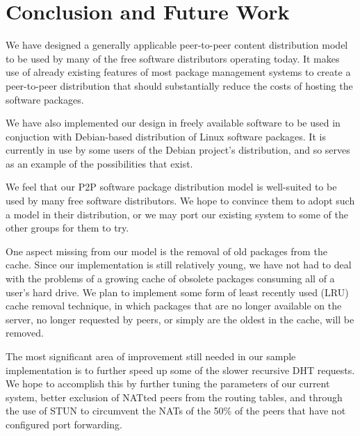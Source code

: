 \documentclass[conference]{IEEEtran}
\begin{document}

\section{Conclusion and Future Work}
\label{conclusions}

We have designed a generally applicable peer-to-peer content
distribution model to be used by many of the free software
distributors operating today. It makes use of already existing
features of most package management systems to create a
peer-to-peer distribution that should substantially reduce the costs
of hosting the software packages.

We have also implemented our design in freely available software to
be used in conjuction with Debian-based distribution of Linux
software packages. It is currently in use by some users of the
Debian project's distribution, and so serves as an example of the
possibilities that exist.

We feel that our P2P software package distribution model is
well-suited to be used by many free software distributors. We hope
to convince them to adopt such a model in their distribution, or we
may port our existing system to some of the other groups for them to
try.

One aspect missing from our model is the removal of old packages
from the cache. Since our implementation is still relatively young,
we have not had to deal with the problems of a growing cache of
obsolete packages consuming all of a user's hard drive. We plan to
implement some form of least recently used (LRU) cache removal
technique, in which packages that are no longer available on the
server, no longer requested by peers, or simply are the oldest in
the cache, will be removed.

The most significant area of improvement still needed in our sample
implementation is to further speed up some of the slower recursive
DHT requests. We hope to accomplish this by further tuning the
parameters of our current system, better exclusion of NATted peers
from the routing tables, and through the use of STUN \cite{STUN} to
circumvent the NATs of the 50\% of the peers that have not
configured port forwarding.



\end{document}
